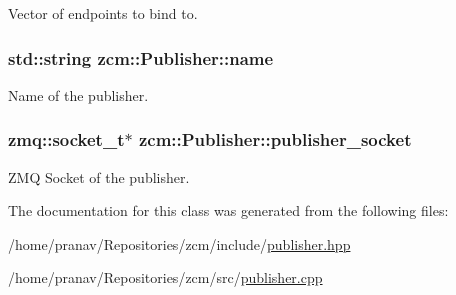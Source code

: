 Vector of endpoints to bind to. 

\subsubsection[{\texorpdfstring{name}{name}}]{\setlength{\rightskip}{0pt plus 5cm}std\+::string zcm\+::\+Publisher\+::name\hspace{0.3cm}{\ttfamily [private]}}\hypertarget{classzcm_1_1Publisher_a2e3902339b55647dc6a7d2f3de64d8fe}{}\label{classzcm_1_1Publisher_a2e3902339b55647dc6a7d2f3de64d8fe}


Name of the publisher. 

\subsubsection[{\texorpdfstring{publisher\+\_\+socket}{publisher_socket}}]{\setlength{\rightskip}{0pt plus 5cm}zmq\+::socket\+\_\+t$\ast$ zcm\+::\+Publisher\+::publisher\+\_\+socket\hspace{0.3cm}{\ttfamily [private]}}\hypertarget{classzcm_1_1Publisher_acb22f36a592a5a0beaf4100e472578d5}{}\label{classzcm_1_1Publisher_acb22f36a592a5a0beaf4100e472578d5}


Z\+MQ Socket of the publisher. 



The documentation for this class was generated from the following files\+:\begin{DoxyCompactItemize}
\item 
/home/pranav/\+Repositories/zcm/include/\hyperlink{publisher_8hpp}{publisher.\+hpp}\item 
/home/pranav/\+Repositories/zcm/src/\hyperlink{publisher_8cpp}{publisher.\+cpp}\end{DoxyCompactItemize}
